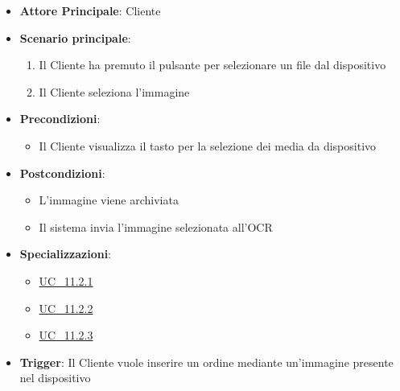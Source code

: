 \begin{itemize}
    \item \textbf{Attore Principale}: Cliente
    \item \textbf{Scenario principale}:
        \begin{enumerate}
            \item Il Cliente ha premuto il pulsante per selezionare un file dal dispositivo
            \item Il Cliente seleziona l'immagine
        \end{enumerate}
    \item \textbf{Precondizioni}:
        \begin{itemize}
            \item Il Cliente visualizza il tasto per la selezione dei media da dispositivo
        \end{itemize}
    \item \textbf{Postcondizioni}: 
        \begin{itemize}
            \item L'immagine viene archiviata
            \item Il sistema invia l'immagine selezionata all'OCR 
        \end{itemize}
    \item \textbf{Specializzazioni}:
        \begin{itemize}
            \item \hyperref[uc_11.2.1]{UC\_11.2.1}
            \item \hyperref[uc_11.2.2]{UC\_11.2.2}
            \item \hyperref[uc_11.2.3]{UC\_11.2.3}
        \end{itemize}
    \item \textbf{Trigger}: Il Cliente vuole inserire un ordine mediante un'immagine presente nel dispositivo
\end{itemize}

\label{uc_11.2.1}

